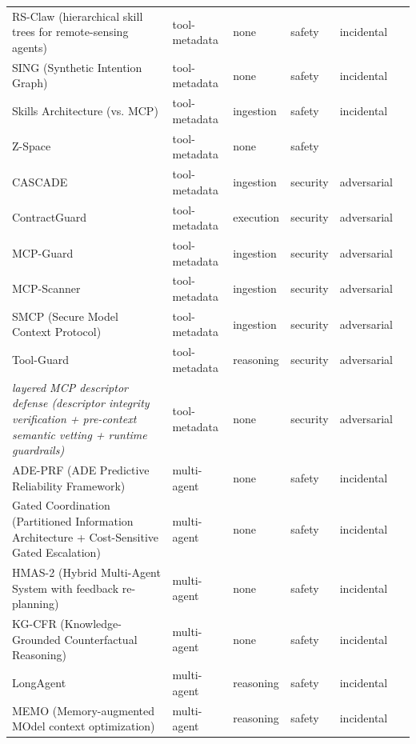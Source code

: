 \begin{longtable}{@{}>{\raggedright\arraybackslash}p{}lllll@{}}
RS-Claw (hierarchical skill trees for remote-sensing agents) & tool-metadata & none & safety & incidental & \cite{liu-2026-rsclaw} \\
SING (Synthetic Intention Graph) & tool-metadata & none & safety & incidental & \cite{xiao-2026-sing} \\
Skills Architecture (vs. MCP) & tool-metadata & ingestion & safety & incidental & \cite{ayyagari-2026-context} \\
Z-Space & tool-metadata & none & safety &  & \cite{he-2025-zspace} \\
CASCADE & tool-metadata & ingestion & security & adversarial & \cite{turgut-2026-cascade} \\
ContractGuard & tool-metadata & execution & security & adversarial & \cite{iyer-2026-gate} \\
MCP-Guard & tool-metadata & ingestion & security & adversarial & \cite{xing-2025-mcpguard} \\
MCP-Scanner & tool-metadata & ingestion & security & adversarial & \cite{abadeh-2026-mcpscanner} \\
SMCP (Secure Model Context Protocol) & tool-metadata & ingestion & security & adversarial & \cite{hou-2026-smcp} \\
Tool-Guard & tool-metadata & reasoning & security & adversarial & \cite{shi-2026-think} \\
\emph{layered MCP descriptor defense (descriptor integrity verification + pre-context semantic vetting + runtime guardrails)} & tool-metadata & none & security & adversarial & \cite{jamshidi-2025-semantic} \\
ADE-PRF (ADE Predictive Reliability Framework) & multi-agent & none & safety & incidental & \cite{liu-2026-agent} \\
Gated Coordination (Partitioned Information Architecture + Cost-Sensitive Gated Escalation) & multi-agent & none & safety & incidental & \cite{jian-2026-gated} \\
HMAS-2 (Hybrid Multi-Agent System with feedback re-planning) & multi-agent & none & safety & incidental & \cite{chen-2023-scalable} \\
KG-CFR (Knowledge-Grounded Counterfactual Reasoning) & multi-agent & none & safety & incidental & \cite{maslowski-2026-decoupling} \\
LongAgent & multi-agent & reasoning & safety & incidental & \cite{zhao-2024-longagent} \\
MEMO (Memory-augmented MOdel context optimization) & multi-agent & reasoning & safety & incidental & \cite{xie-2026-memo} \\

\end{longtable}
